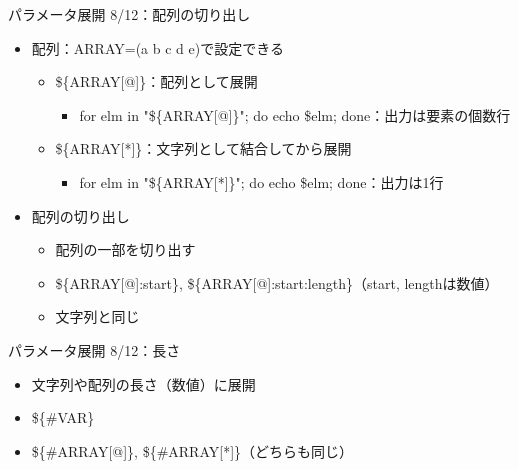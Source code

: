 \documentclass[12pt,aspectratio=169]{beamer}
\begin{document}
\begin{frame}{パラメータ展開 8/12：配列の切り出し}

  \begin{itemize}
    \item 配列：ARRAY=(a b c d e)で設定できる
    \begin{itemize}
      \item \$\{ARRAY[@]\}：配列として展開
        \begin{itemize}
          \item for elm in "\$\{ARRAY[@]\}"; do echo \$elm; done：出力は要素の個数行
        \end{itemize}
      \item \$\{ARRAY[*]\}：文字列として結合してから展開
        \begin{itemize}
          \item for elm in "\$\{ARRAY[*]\}"; do echo \$elm; done：出力は1行
        \end{itemize}
    \end{itemize}

    \item 配列の切り出し
      \begin{itemize}
        \item 配列の一部を切り出す
        \item \$\{ARRAY[@]:start\}, \$\{ARRAY[@]:start:length\}（start, lengthは数値）
        \item 文字列と同じ
      \end{itemize}

  \end{itemize}

\end{frame}


\begin{frame}{パラメータ展開 8/12：長さ}

  \begin{itemize}
    \item 文字列や配列の長さ（数値）に展開
    \item \$\{\#VAR\}
    \item \$\{\#ARRAY[@]\}, \$\{\#ARRAY[*]\}（どちらも同じ）
  \end{itemize}

\end{frame}
\end{document}

